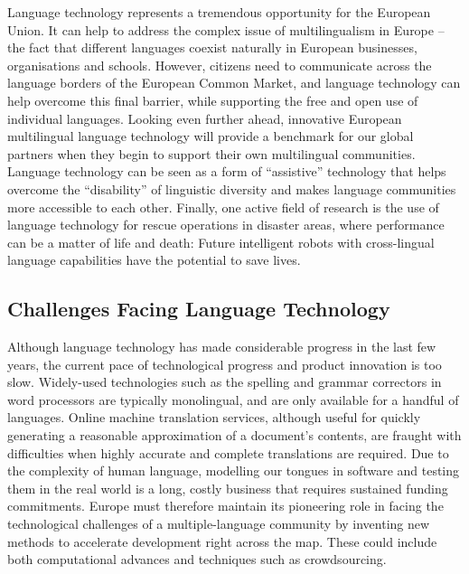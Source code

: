 \documentclass[]{../../metanetpaper}
\begin{document}
\begin{multicols}{2}

Language technology represents a tremendous opportunity for the European Union. It can help to address the complex issue of multilingualism in Europe – the fact that different languages coexist naturally in European businesses, organisations and schools. However, citizens need to communicate across the language borders of the European Common Market, and language technology can help overcome this final barrier, while supporting the free and open use of individual languages. Looking even further ahead, innovative European multilingual language technology will provide a benchmark for our global partners when they begin to support their own multilingual communities. Language technology can be seen as a form of “assistive” technology that helps overcome the “disability” of linguistic diversity and makes language communities more accessible to each other. Finally, one active field of research is the use of language technology for rescue operations in disaster areas, where performance can be a matter of life and death: Future intelligent robots with cross-lingual language capabilities have the potential to save lives.

\subsection{Challenges Facing Language Technology}

Although language technology has made considerable progress in the last few years, the current pace of technological progress and product innovation is too slow. Widely-used technologies such as the spelling and grammar correctors in word processors are typically monolingual, and are only available for a handful of languages. Online machine translation services, although useful for quickly generating a reasonable approximation of a document’s contents, are fraught with difficulties when highly accurate and complete translations are required. Due to the complexity of human language, modelling our tongues in software and testing them in the real world is a long, costly business that requires sustained funding commitments. Europe must therefore maintain its pioneering role in facing the technological challenges of a multiple-language community by inventing new methods to accelerate development right across the map. These could include both computational advances and techniques such as crowdsourcing.


\end{multicols}
\end{document}

